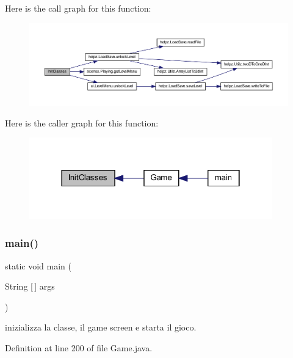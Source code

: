 Here is the call graph for this function\+:
\nopagebreak
\begin{figure}[H]
\begin{center}
\leavevmode
\includegraphics[width=350pt]{classprogetto_1_1_game_a3e57c234c3dde4539f8b9c47d75e59ae_cgraph}
\end{center}
\end{figure}
Here is the caller graph for this function\+:\nopagebreak
\begin{figure}[H]
\begin{center}
\leavevmode
\includegraphics[width=298pt]{classprogetto_1_1_game_a3e57c234c3dde4539f8b9c47d75e59ae_icgraph}
\end{center}
\end{figure}
\mbox{\label{classprogetto_1_1_game_a8b260eecbaabcef8473fd87ada040682}} 
\subsubsection{\texorpdfstring{main()}{main()}}
{\footnotesize\ttfamily static void main (\begin{DoxyParamCaption}\item[{String \mbox{[}$\,$\mbox{]}}]{args }\end{DoxyParamCaption})\hspace{0.3cm}{\ttfamily [static]}}



inizializza la classe, il game screen e starta il gioco. 



Definition at line 200 of file Game.\+java.

